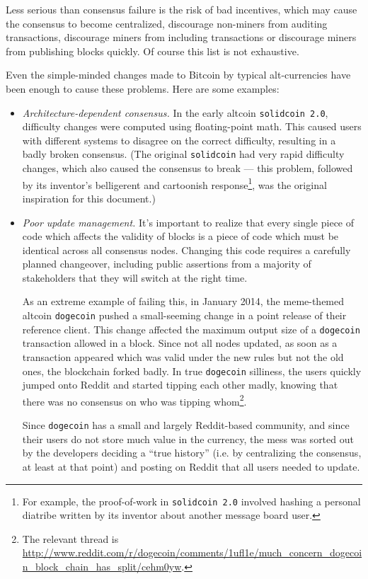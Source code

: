 \documentclass[letterpaper]{article}
\begin{document}
Less serious than consensus failure is the risk of bad incentives, which may cause
the consensus to become centralized, discourage non-miners from auditing transactions,
discourage miners from including transactions or discourage miners from publishing
blocks quickly. Of course this list is not exhaustive.

Even the simple-minded changes made to Bitcoin by typical alt-currencies have been
enough to cause these problems. Here are some examples:

\begin{itemize}
\item \emph{Architecture-dependent consensus.} In the early altcoin \texttt{solidcoin
2.0}, difficulty changes were computed using floating-point math. This caused users
with different systems to disagree on the correct difficulty, resulting in a badly
broken consensus. (The original \texttt{solidcoin} had very rapid difficulty changes,
which also caused the consensus to break --- this problem, followed by its inventor's
belligerent and cartoonish response\footnote{For example, the proof-of-work in
\texttt{solidcoin 2.0} involved hashing a personal diatribe written by its inventor
about another message board user.}, was the original inspiration for this document.)

\item \emph{Poor update management.} It's important to realize that every single
piece of code which affects the validity of blocks is a piece of code which must
be identical across all consensus nodes. Changing this code requires a carefully
planned changeover, including public assertions from a majority of stakeholders
that they will switch at the right time.

As an extreme example of failing this, in January 2014, the meme-themed altcoin
\texttt{dogecoin} pushed a small-seeming change in a point release of their reference
client. This change affected the maximum output size of a \texttt{dogecoin}
transaction allowed in a block. Since not all nodes updated, as soon as a transaction
appeared which was valid under the new rules but not the old ones, the blockchain
forked badly. In true \texttt{dogecoin} silliness, the users quickly jumped onto
Reddit and started tipping each other madly, knowing that there was no consensus
on who was tipping whom\footnote{The relevant thread is \url{http://www.reddit.com/r/dogecoin/comments/1ufl1e/much_concern_dogecoin_block_chain_has_split/cehm0yw}.}.

Since \texttt{dogecoin} has a small and largely Reddit-based community, and since
their users do not store much value in the currency, the mess was sorted out by
the developers deciding a ``true history'' (i.e. by centralizing the consensus,
at least at that point) and posting on Reddit that all users needed to update.


\end{itemize}
\end{document}

